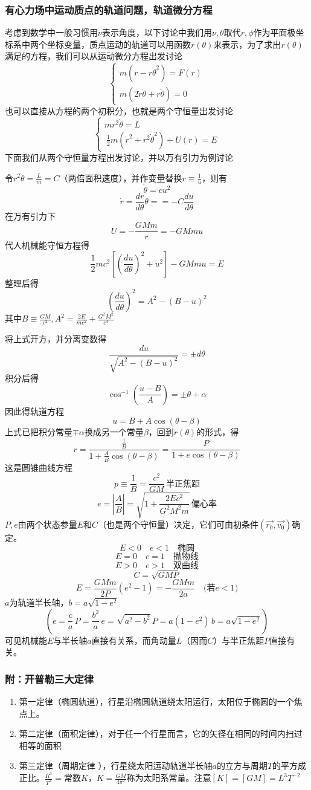 \subsubsection{有心力场中运动质点的轨道问题，轨道微分方程}
考虑到数学中一般习惯用$\nu$表示角度，以下讨论中我们用$\nu,\theta$取代$r,\phi$作为平面极坐标系中两个坐标变量，质点运动的轨道可以用函数$r(\theta)$来表示，为了求出$r(\theta)$满足的方程，我们可以从运动微分方程出发讨论
\[\begin{cases}
m(\ddot{r}-r\dot{\theta}^2)=F(r)\\
m(2\dot{r}\dot{\theta}+r\ddot{\theta})=0
\end{cases}
\]
也可以直接从方程的两个初积分，也就是两个守恒量出发讨论
\[\begin{cases}
mr^2\dot{\theta}=L\\\
\frac{1}{2}m(\dot{r}^2+r^2\dot{\theta}^2)+U(r)=E
\end{cases}
\]
下面我们从两个守恒量方程出发讨论，并以万有引力为例讨论

令$r^2\dot{\theta}=\frac{L}{m}=C$（两倍面积速度），并作变量替换$r\equiv\frac{1}{u}$，则有
\[\dot{\theta}=cu^2\]
\[\dot{r}=\frac{dr}{d\theta}\dot{\theta}==-C\frac{du}{d\theta}\]
在万有引力下
\[U=-\frac{GMm}{r}=-GMmu\]
代人机械能守恒方程得
\[\frac{1}{2}mc^2\left[(\frac{du}{d\theta})^2+u^2\right]-GMmu=E\]
整理后得
\[(\frac{du}{d\theta})^2=A^2-(B-u)^2\]
其中$B\equiv \frac{GM}{c^2},A^2=\frac{2E}{mc^2}+\frac{G^2M^2}{c^4}$

将上式开方，并分离变数得
\[\frac{du}{\sqrt{A^2-(B-u)^2}}=\pm d\theta\]
积分后得
\[\cos^{-1}(\frac{u-B}{A})=\pm \theta+\alpha\]
因此得轨道方程
\[u=B+A\cos(\theta-\beta)\]
上式已把积分常量$\mp \alpha$换成另一个常量$\beta$，回到$r(\theta)$的形式，得
\[r=\frac{\frac{1}{B}}{1+\frac{A}{B}\cos(\theta-\beta)}=\frac{P}{1+e\cos(\theta-\beta)}\]
这是圆锥曲线方程
\[p\equiv \frac{1}{B}=\frac{c^2}{GM}\,\text{半正焦距}\]
\[e=|\frac{A}{B}|=\sqrt{1+\frac{2Ec^2}{G^2M^2m}}\,\text{偏心率}\]
$P,e$由两个状态参量$E$和$C$（也是两个守恒量）决定，它们可由初条件$(\vec{r_0},\vec{v_0})$确定。
\[E<0\quad e<1\quad \text{椭圆}\]
\[E=0\quad e=1\quad \text{抛物线}\]
\[E>0\quad e>1\quad \text{双曲线}\]
\[C=\sqrt{GMP}\]
\[E=\frac{GMm}{2P}(e^2-1)=-\frac{GMm}{2a}\quad\text{(若$e<1$)}\]
$a$为轨道半长轴，$b=a\sqrt{1-e^2}$
\[(e=\frac{c}{a}\, P=\frac{b^2}{a}\, e=\sqrt{a^2-b^2}\, P=a(1-e^2)\, b=a\sqrt{1-e^2})\]
可见机械能$E$与半长轴$a$直接有关系，而角动量$L$（因而$C$）与半正焦距$P$直接有关。
\subsubsection{附：开普勒三大定律}
\begin{enumerate}
\item 第一定律（椭圆轨道），行星沿椭圆轨道绕太阳运行，太阳位于椭圆的一个焦点上。
\item 第二定律（面积定律），对于任一个行星而言，它的矢径在相同的时间内扫过相等的面积
\item 第三定律（周期定律 ），行星绕太阳运动轨道半长轴$a$的立方与周期$T$的平方成正比。$\frac{R^3}{T^2}=$常数$K$，$K=\frac{GM}{4\pi^2}$称为太阳系常量。注意$[K]=[GM]=L^3T^{-2}$
\end{enumerate}

